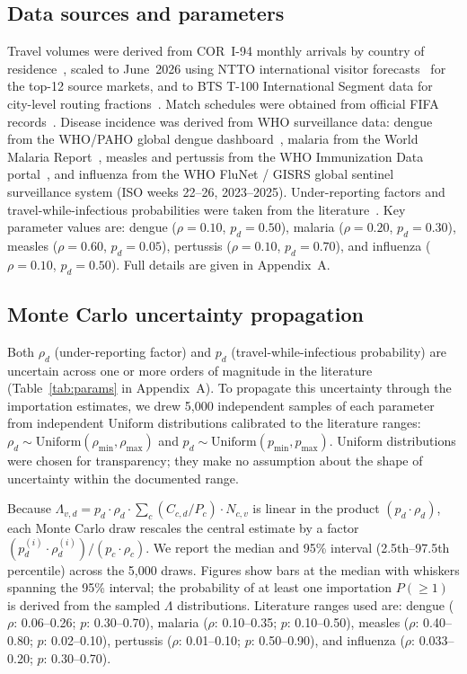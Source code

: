 \documentclass[12pt]{article}
\begin{document}
\subsection*{Data sources and parameters}

Travel volumes were derived from COR~I-94 monthly arrivals by country
of residence~\cite{CBP_I94}, scaled to June~2026 using NTTO
international visitor forecasts~\cite{NTTO2025} for the top-12
source markets, and to BTS T-100 International Segment data for
city-level routing fractions~\cite{BTS_T100}. Match schedules were
obtained from official FIFA records~\cite{FIFA2026_schedule}.
Disease incidence was derived from WHO surveillance data: dengue
from the WHO/PAHO global dengue dashboard~\cite{WHO_dengue},
malaria from the World Malaria Report~\cite{whoWMR2024}, measles
and pertussis from the WHO Immunization Data
portal~\cite{WHO_immunization}, and influenza from the WHO FluNet /
GISRS global sentinel surveillance system (ISO weeks 22--26,
2023--2025). Under-reporting factors and travel-while-infectious
probabilities were taken from the
literature~\cite{bhatt2013,undurraga2013,whoWMR2024,simons2012,mclaughlin2016}.
Key parameter values are: dengue ($\rho=0.10$, $p_d=0.50$), malaria
($\rho=0.20$, $p_d=0.30$), measles ($\rho=0.60$, $p_d=0.05$),
pertussis ($\rho=0.10$, $p_d=0.70$), and influenza ($\rho=0.10$,
$p_d=0.50$). Full details are given in Appendix~A.

\subsection*{Monte Carlo uncertainty propagation}

Both $\rho_d$ (under-reporting factor) and $p_d$ (travel-while-infectious probability) are uncertain across one or more orders of magnitude in the literature (Table~\ref{tab:params} in Appendix~A). To propagate this uncertainty through the importation estimates, we drew 5,000 independent samples of each parameter from independent Uniform distributions calibrated to the literature ranges: $\rho_d \sim \text{Uniform}(\rho_\text{min}, \rho_\text{max})$ and $p_d \sim \text{Uniform}(p_\text{min}, p_\text{max})$. Uniform distributions were chosen for transparency; they make no assumption about the shape of uncertainty within the documented range.

Because $\Lambda_{v,d} = p_d \cdot \rho_d \cdot \sum_c (C_{c,d}/P_c) \cdot N_{c,v}$ is linear in the product $(p_d \cdot \rho_d)$, each Monte Carlo draw rescales the central estimate by a factor $(p_d^{(i)} \cdot \rho_d^{(i)}) / (p_c \cdot \rho_c)$. We report the median and 95\% interval (2.5th--97.5th percentile) across the 5,000 draws. Figures show bars at the median with whiskers spanning the 95\% interval; the probability of at least one importation $P(\geq 1)$ is derived from the sampled $\Lambda$ distributions. Literature ranges used are: dengue ($\rho$: 0.06--0.26; $p$: 0.30--0.70), malaria ($\rho$: 0.10--0.35; $p$: 0.10--0.50), measles ($\rho$: 0.40--0.80; $p$: 0.02--0.10), pertussis ($\rho$: 0.01--0.10; $p$: 0.50--0.90), and influenza ($\rho$: 0.033--0.20; $p$: 0.30--0.70).
\end{document}
